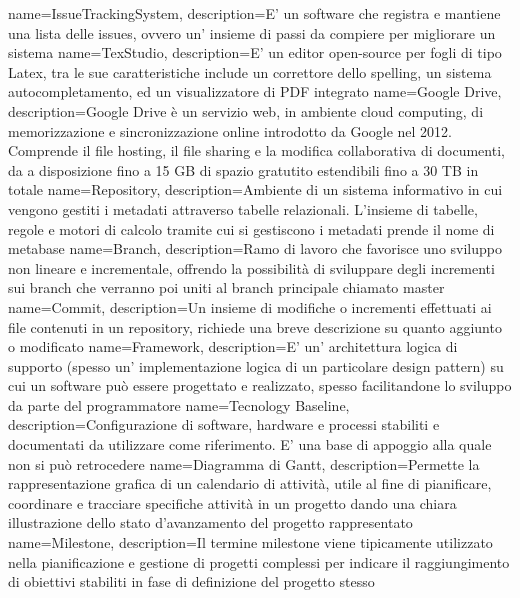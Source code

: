 {
    name=IssueTrackingSystem,
    description={E' un software che registra e mantiene una lista delle issues, ovvero un' insieme di passi da compiere per migliorare un sistema}
}
{
    name=TexStudio,
    description={E' un editor open-source per fogli di tipo Latex, tra le sue caratteristiche include un correttore dello spelling, un sistema autocompletamento, ed un visualizzatore di PDF integrato}
}
{
    name=Google Drive,
    description={Google Drive è un servizio web, in ambiente cloud computing, di memorizzazione e sincronizzazione online introdotto da Google nel 2012. Comprende il file hosting, il file sharing e la modifica collaborativa di documenti, da a disposizione fino a 15 GB di spazio gratutito estendibili fino a 30 TB in totale}
}
{
    name=Repository,
    description={Ambiente di un sistema informativo in cui vengono  gestiti i metadati attraverso tabelle relazionali. L’insieme di tabelle, regole e motori di calcolo tramite cui si gestiscono i metadati prende il nome di metabase}
}
{
    name=Branch,
    description={Ramo di lavoro che favorisce uno sviluppo non lineare e incrementale, offrendo la possibilità di sviluppare degli incrementi sui branch che verranno poi uniti al branch principale chiamato master}
}
{
    name=Commit,
    description={Un insieme di modifiche o incrementi effettuati ai file contenuti in un repository, richiede una breve descrizione su quanto aggiunto o modificato}
}
{
    name=Framework,
    description={E' un' architettura logica di supporto (spesso un' implementazione logica di un particolare design pattern) su cui un software può essere progettato e realizzato, spesso facilitandone lo sviluppo da parte del programmatore}
}
{
    name=Tecnology Baseline,
    description={Configurazione di software, hardware e processi stabiliti e documentati da utilizzare come riferimento. E' una base di appoggio alla quale non si può retrocedere}
}
{
    name=Diagramma di Gantt,
    description={Permette la rappresentazione grafica di un calendario di attività, utile al fine di pianificare, coordinare e tracciare specifiche attività in un progetto dando una chiara illustrazione dello stato d'avanzamento del progetto rappresentato}
}
{
    name=Milestone,
    description={Il termine milestone viene tipicamente utilizzato nella pianificazione e gestione di progetti complessi per indicare il raggiungimento di obiettivi stabiliti in fase di definizione del progetto stesso}
}
